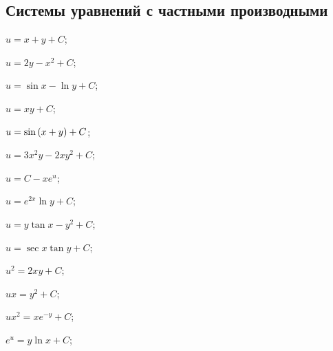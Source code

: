 \subsection*{Системы уравнений с частными производными}

	\begin{enumsols}

		\item \( u = x + y + C \); \sfill %
		\item \( u = 2y - x^2 + C \); \sfill %
		\item \( u = \sin{x} - \ln{y} + C \); \sfill %
		\item \( u = xy + C \); \sfill %
		\item \( u = \sin\left( x + y \right) + C \); \sfill %
		\item \( u = 3x^2 y - 2xy^2 + C \); \sfill %
		\item \( u = C - x e^{u} \); \sfill %
		\item \( u = e^{2x} \ln{y} + C \); \sfill %
		\item \( u = y \tan{x} - y^2 + C \); \sfill %
		\item \( u = \sec{x} \tan{y} + C \); \sfill %
		\item \( u^2 = 2xy + C \); \sfill %
		\item \( ux = y^2 + C \); \sfill %
		\item \( ux^2 = x e^{-y} + C \); \sfill %
		\item \( e^u = y \ln{x} + C \); \sfill %

\end{enumsols}
